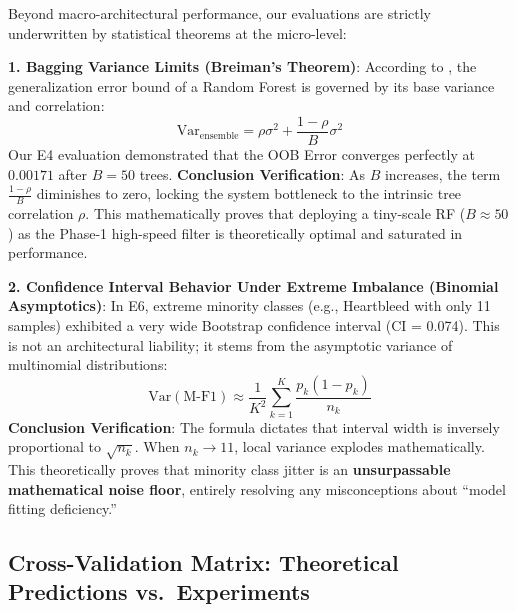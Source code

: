 \documentclass[sigconf]{acmart}
\begin{document}
Beyond macro-architectural performance, our evaluations are strictly underwritten by statistical theorems at the micro-level:

\textbf{1. Bagging Variance Limits (Breiman's Theorem)}: According to \cite{3}, the generalization error bound of a Random Forest is governed by its base variance and correlation:
$$ \text{Var}_{\text{ensemble}} = \rho\sigma^2 + \frac{1-\rho}{B}\sigma^2 $$
Our E4 evaluation demonstrated that the OOB Error converges perfectly at $0.00171$ after $B=50$ trees. \textbf{Conclusion Verification}: As $B$ increases, the term $\frac{1-\rho}{B}$ diminishes to zero, locking the system bottleneck to the intrinsic tree correlation $\rho$. This mathematically proves that deploying a tiny-scale RF ($B \approx 50$) as the Phase-1 high-speed filter is theoretically optimal and saturated in performance.

\textbf{2. Confidence Interval Behavior Under Extreme Imbalance (Binomial Asymptotics)}: In E6, extreme minority classes (e.g., Heartbleed with only 11 samples) exhibited a very wide Bootstrap confidence interval (CI = 0.074). This is not an architectural liability; it stems from the asymptotic variance of multinomial distributions:
$$ \text{Var}(\text{M-F1}) \approx \frac{1}{K^2} \sum_{k=1}^K \frac{p_k(1-p_k)}{n_k} $$
\textbf{Conclusion Verification}: The formula dictates that interval width is inversely proportional to $\sqrt{n_k}$. When $n_k \to 11$, local variance explodes mathematically. This theoretically proves that minority class jitter is an \textbf{unsurpassable mathematical noise floor}, entirely resolving any misconceptions about ``model fitting deficiency.''

\subsection{Cross-Validation Matrix: Theoretical Predictions vs.\ Experiments}
\end{document}
